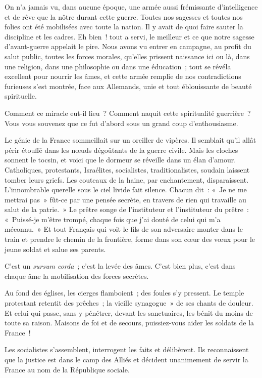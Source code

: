 \documentclass[french,twoside]{book} %
\newcommand\chaptercont{} %
\begin{document}
\chaptercont
\noindent On n’a jamais vu, dans aucune époque, une armée aussi frémissante d’intelligence et de rêve que la nôtre durant cette guerre. Toutes nos sagesses et toutes nos folies ont été mobilisées avec toute la nation. Il y avait de quoi faire sauter la discipline et les cadres. Eh bien ! tout a servi, le meilleur et ce que notre sagesse d’avant-guerre appelait le pire. Nous avons vu entrer en campagne, au profit du salut public, toutes les forces morales, qu’elles prissent naissance ici ou là, dans une religion, dans une philosophie ou dans une éducation ; tout se révéla excellent pour nourrir les âmes, et cette armée remplie de nos contradictions furieuses s’est montrée, face aux Allemands, unie et tout éblouissante de beauté spirituelle.‌\par
Comment ce miracle eut-il lieu ? Comment naquit cette spiritualité guerrière ? Vous vous souvenez que ce fut d’abord sous un grand coup d’enthousiasme.\par
Le génie de la France sommeillait sur un oreiller de vipères. Il semblait qu’il allât périr étouffé dans les nœuds dégoûtants de la guerre civile. Mais les cloches sonnent le tocsin, et voici que le dormeur se réveille dans un élan d’amour. Catholiques, protestants, Israélites, socialistes, traditionalistes, soudain laissent tomber leurs griefs. Les couteaux de la haine, par enchantement, disparaissent. L’innombrable querelle sous le ciel livide fait silence. Chacun dit : « Je ne me mettrai pas » fût-ce par une pensée secrète, en travers de rien qui travaille au salut de la patrie. » Le prêtre songe de l’instituteur et l’instituteur du prêtre : « Puissé-je m’être trompé, chaque fois que j’ai douté de celui qui m’a méconnu. » Et tout Français qui voit le fils de son adversaire monter dans le train et prendre le chemin de la frontière, forme dans son cœur des vœux pour le jeune soldat et salue ses parents.\par
C’est un {\itshape sursum corda} ; c’est la levée des âmes. C’est bien plus, c’est dans chaque âme la mobilisation des forces secrètes.‌\par
Au fond des églises, les cierges flamboient ; des foules s’y pressent. Le temple protestant retentit des prêches ; la vieille synagogue » de ses chants de douleur. Et celui qui passe, sans y pénétrer, devant les sanctuaires, les bénit du moins de toute sa raison. Maisons de foi et de secours, puissiez-vous aider les soldats de la France !\par
Les socialistes s’assemblent, interrogent les faits et délibèrent. Ils reconnaissent que la justice est dans le camp des Alliés et décident unanimement de servir la France au nom de la République sociale.‌\par
\end{document}

